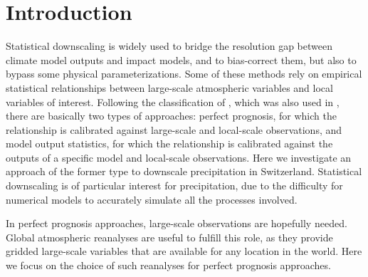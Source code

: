 \documentclass{ametsoc}
\begin{document}
	
	
	
	\section{Introduction}
	
	Statistical downscaling is widely used to bridge the resolution gap between climate model outputs and impact models, and to bias-correct them, but also to bypass some physical parameterizations. Some of these methods rely on empirical statistical relationships between large-scale atmospheric variables and local variables of interest. Following the classification of \citet{Rummukainen1997}, which was also used in \citet{Maraun2010}, there are basically two types of approaches: perfect prognosis, for which the relationship is calibrated against large-scale and local-scale observations, and model output statistics, for which the relationship is calibrated against the outputs of a specific model and local-scale observations. Here we investigate an approach of the former type to downscale precipitation in Switzerland. Statistical downscaling is of particular interest for precipitation, due to the difficulty for numerical models to accurately simulate all the processes involved.
	
	In perfect prognosis approaches, large-scale observations are hopefully needed. Global atmospheric reanalyses are useful to fulfill this role, as they provide gridded large-scale variables that are available for any location in the world. Here we focus on the choice of such reanalyses for perfect prognosis approaches. 
	
\end{document}
